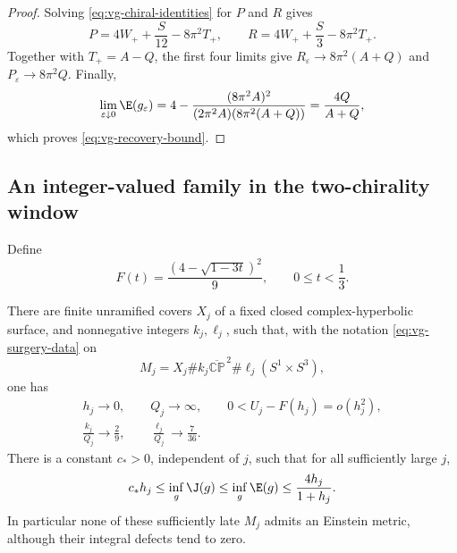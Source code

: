 \begin{proof}
Solving \eqref{eq:vg-chiral-identities} for $P$ and $R$ gives
\[
 P=4W_++\frac S{12}-8\pi^2T_+,
 \qquad R=4W_++\frac S3-8\pi^2T_+.
\]
Together with $T_+=A-Q$, the first four limits give
$R_\varepsilon\to8\pi^2(A+Q)$ and
$P_\varepsilon\to8\pi^2Q$.  Finally,
\[
 \lim_{\varepsilon\downarrow0}\E(g_\varepsilon)
 =4-\frac{(8\pi^2A)^2}{(2\pi^2A)(8\pi^2(A+Q))}
 =\frac{4Q}{A+Q},
\]
which proves \eqref{eq:vg-recovery-bound}.
\end{proof}

\subsection{An integer-valued family in the two-chirality window}

Define
\begin{equation}\label{eq:vg-F}
 F(t)=\frac{(4-\sqrt{1-3t})^2}{9},\qquad 0\leq t<\frac13.
\end{equation}

\begin{theorem}\label{thm:vg-balanced-family}
There are finite unramified covers $X_j$ of a fixed closed
complex-hyperbolic surface, and nonnegative integers $k_j,\ell_j$, such
that, with the notation \eqref{eq:vg-surgery-data} on
\[
 M_j=X_j\#k_j\overline{\mathbb{CP}}^{\,2}\#\ell_j(S^1\times S^3),
\]
one has
\begin{equation}\label{eq:vg-balanced-window}
 \begin{gathered}
 h_j\longrightarrow0,\qquad Q_j\longrightarrow\infty,
 \qquad 0<U_j-F(h_j)=o(h_j^2),\\
 \frac{k_j}{Q_j}\longrightarrow\frac29,
 \qquad \frac{\ell_j}{Q_j}\longrightarrow\frac7{36}.
 \end{gathered}
\end{equation}
There is a constant $c_*>0$, independent of $j$, such that for all
sufficiently large $j$,
\begin{equation}\label{eq:vg-linear-sandwich}
 c_*h_j\leq\inf_g\J(g)\leq\inf_g\E(g)
                         \leq\frac{4h_j}{1+h_j}.
\end{equation}
In particular none of these sufficiently late $M_j$ admits an Einstein
metric, although their integral defects tend to zero.
\end{theorem}

